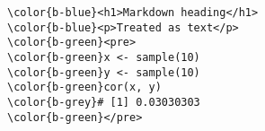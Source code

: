 \documentclass[class=minimal,border=0]{standalone}
\begin{document}
%
\begin{BVerbatim}[bgcolor=b-darkgrey]
\color{b-blue}<h1>Markdown heading</h1>
\color{b-blue}<p>Treated as text</p>
\color{b-green}<pre>
\color{b-green}x <- sample(10)
\color{b-green}y <- sample(10)
\color{b-green}cor(x, y)
\color{b-grey}# [1] 0.03030303
\color{b-green}</pre>
\end{BVerbatim}
\end{document}
